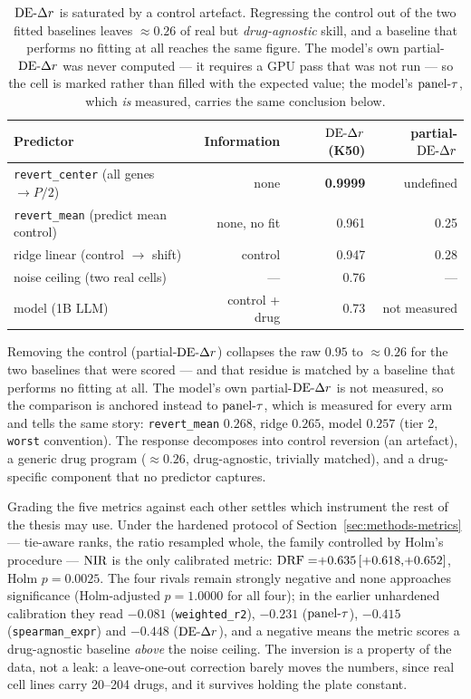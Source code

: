 \begin{table}[h]
\centering
\begin{tabular}{lrrr}
\toprule
Predictor & Information & $\textrm{DE-}\Delta r$ (K50) & partial-$\textrm{DE-}\Delta r$ \\
\midrule
\texttt{revert\_center} (all genes $\rightarrow P/2$) & none & \textbf{0.9999} & undefined \\
\texttt{revert\_mean} (predict mean control) & none, no fit & 0.961 & 0.25 \\
ridge linear (control $\rightarrow$ shift) & control & 0.947 & 0.28 \\
noise ceiling (two real cells) & --- & 0.76 & --- \\
model (1B LLM) & control + drug & 0.73 & not measured \\
\bottomrule
\end{tabular}
\caption{$\textrm{DE-}\Delta r$ is saturated by a control artefact. Regressing the control out of the two fitted
baselines leaves $\approx 0.26$ of real but \emph{drug-agnostic} skill, and a baseline that performs
no fitting at all reaches the same figure. The model's own partial-$\textrm{DE-}\Delta r$ was never computed --- it
requires a GPU pass that was not run --- so the cell is marked rather than filled with the expected
value; the model's $\textrm{panel-}\tau$, which \emph{is} measured, carries the same conclusion below.}
\label{tab:de-artifact}
\end{table}

Removing the control (partial-$\textrm{DE-}\Delta r$) collapses the raw $0.95$ to $\approx 0.26$ for the two
baselines that were scored --- and that residue is matched by a baseline that performs no fitting at
all. The model's own partial-$\textrm{DE-}\Delta r$ is not measured, so the comparison is anchored instead to
$\textrm{panel-}\tau$, which is measured for every arm and tells the same story: \texttt{revert\_mean} $0.268$,
ridge $0.265$, model $0.257$ (tier 2, \texttt{worst} convention). The response decomposes into
control reversion (an artefact), a generic drug program ($\approx 0.26$, drug-agnostic, trivially
matched), and a drug-specific component that no predictor captures.

Grading the five metrics against each other settles which instrument the rest of the thesis may
use. Under the hardened \DRF{} protocol of Section~\ref{sec:methods-metrics} --- tie-aware ranks,
the ratio resampled whole, the family controlled by Holm's procedure --- $\textrm{NIR}$ is the only
calibrated metric: $\DRF = \ci{+0.635}{+0.618}{+0.652}$, Holm $p = 0.0025$. The four rivals remain
strongly negative and none approaches significance (Holm-adjusted $p = 1.0000$ for all four); in
the earlier unhardened calibration they read $-0.081$ (\texttt{weighted\_r2}), $-0.231$
($\textrm{panel-}\tau$), $-0.415$ (\texttt{spearman\_expr}) and $-0.448$ ($\textrm{DE-}\Delta r$), and a negative \DRF{}
means the metric scores a drug-agnostic baseline \emph{above} the noise ceiling. The inversion is a
property of the data, not a leak: a leave-one-out correction barely moves the numbers, since real
cell lines carry 20--204 drugs, and it survives holding the plate constant.

